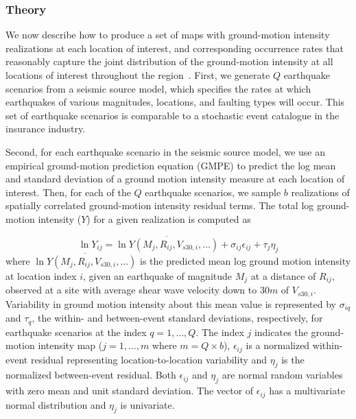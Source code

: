 \subsubsection{Theory}
We now describe how to produce a set of maps with ground-motion intensity realizations at each location of interest, and corresponding occurrence rates that reasonably capture the joint distribution of the ground-motion intensity at all locations of interest throughout the region~\cite[e.g.,][]{han_probabilistic_2012}. First, we generate $Q$ earthquake scenarios from a seismic source model, which specifies the rates at which earthquakes of various magnitudes, locations, and faulting types will occur. This set of earthquake scenarios is comparable to a stochastic event catalogue in the insurance industry.

Second, for each earthquake scenario in the seismic source model, we use an empirical ground-motion prediction equation (GMPE) to predict the log mean and standard deviation of a ground motion intensity measure at each location of interest. Then, for each of the $Q$ earthquake scenarios, we sample $b$ realizations of spatially correlated ground-motion intensity residual terms. 
The total log ground-motion intensity ($Y$) for a given realization is computed as 

\begin{equation}
\ln Y_{ij} = \overline{\ln Y (M_j, R_{ij}, V_{s30,i}, \ldots) }+ \sigma_{ij} \epsilon_{ij} + \tau_j \eta_j
\label{eq:GMPEmet}
\end{equation}
where $\overline{\ln Y (M_j, R_{ij}, V_{s30,i}, \ldots) }$ is the predicted mean log ground motion intensity at location index $i$, given an earthquake of magnitude $M_j$ at a distance of $R_{ij}$, observed at a site with average shear wave velocity down to 30$m$ of $V_{s30,i}$. Variability in ground motion intensity about this mean value is represented by $\sigma_{iq}$ and $\tau_q$, the within- and between-event standard deviations, respectively, for earthquake scenarios at the index $q = 1, \ldots, Q$.
The index $j$ indicates the ground-motion intensity map ($j = 1, \ldots, m$ where $m = Q \times b$), $\epsilon_{ij}$ is a normalized within-event residual representing location-to-location variability and $\eta_j$ is the normalized between-event residual. Both $\epsilon_{ij}$ and $\eta_j$ are normal random variables with zero mean and unit standard deviation. The vector of $\epsilon_{ij}$ has a multivariate normal distribution 
and $\eta_j$ is univariate. 


